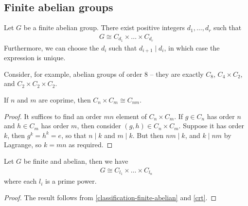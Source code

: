 \documentclass{../template/note}
\begin{document}
    \subsection{Finite abelian groups}

    \begin{theorem}
        \label{classification-finite-abelian}
        Let $G$ be a finite abelian group. There exist positive integers $d_1, \dots, d_r$ such that
        \begin{align*}
            G \cong C_{d_1} \times \dots \times C_{d_r}
        \end{align*}
        Furthermore, we can choose the $d_i$ such that $d_{i+1} \mid d_i$, in which case the expression is unique.
    \end{theorem}
    
    \begin{example}
        Consider, for example, abelian groups of order 8 -- they are exactly $C_8$, $C_4 \times C_2$, and $C_2 \times C_2 \times C_2$.
    \end{example}
    
    \begin{lemma}
        \label{crt}
        If $n$ and $m$ are coprime, then $C_n \times C_m \cong C_{nm}$.
    \end{lemma}
    
    \begin{proof}
        It suffices to find an order $mn$ element of $C_n \times C_m$. If $g \in C_n$ has order $n$ and $h \in C_m$ has order $m$, then consider $(g, h) \in C_n \times C_m$. Suppose it has order $k$, then $g^k = h^k = e$, so that $n \mid k$ and $m \mid k$. But then $nm \mid k$, and $k \mid nm$ by Lagrange, so $k=mn$ as required.
    \end{proof}
    

    \begin{corollary}
        Let $G$ be finite and abelian, then we have
        \begin{align*}
            G \cong C_{l_1} \times \dots \times C_{l_n}
        \end{align*}
        where each $l_i$ is a prime power.        
    \end{corollary}
    
    \begin{proof}
        The result follows from \cref{classification-finite-abelian} and \cref{crt}.
    \end{proof}
    
\end{document}
